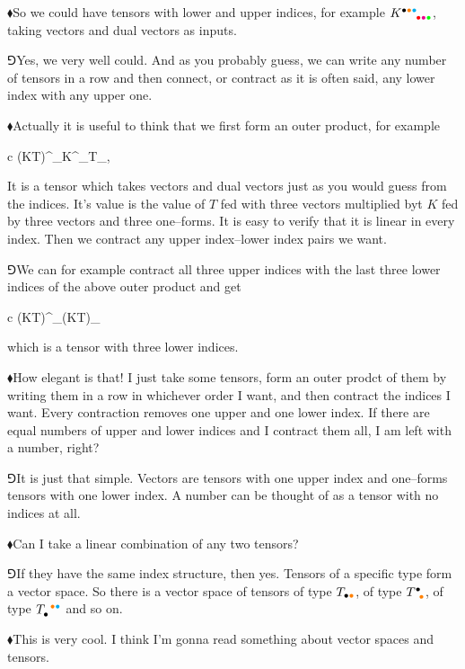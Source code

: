 \documentclass[11pt,oneside%
]{memoir}
\newenvironment{eqna}{\begin{IEEEeqnarray*}{c}}{\end{IEEEeqnarray*}\ignorespacesafterend}
\newcommand{\tensa}[2]{#1_{#2}}
\newcommand{\tensay}[3]{#1_{#2}^{\phantom{#2}#3}}
\newcommand{\tensya}[3]{#1^{#2}_{\phantom{#2}#3}}
\newcommand{\hea}{\(\blacklozenge\)\;}
\newcommand{\heb}{\(\Game\)\;}
\newcommand{\coa}{{\color{black}\bullet}}
\newcommand{\cob}{{\color{oranssi}\bullet}}
\newcommand{\coc}{{\color{cyan}\bullet}}
\newcommand{\cod}{{\color{red}\bullet}}
\newcommand{\coe}{{\color{magenta}\bullet}}
\newcommand{\cof}{{\color{green}\bullet}}
\newcommand{\cog}{{\color{safi}\bullet}}
\newcommand{\coh}{{\color{yellow}\bullet}}
\newcommand{\coi}{{\color{blue}\bullet}}
\begin{document}
\hea So we could have tensors with lower and upper indices, for example \(\tensya{K}{\coa\cob\coc}{\cod\coe\cof}\), taking vectors and dual vectors as inputs.

\heb Yes, we very well could. And as you probably guess, we can write any number of tensors in a row and then connect, or contract as it is often said, any lower index with any upper one.

\hea Actually it is useful to think that we first form an outer product, for example
\begin{eqna}
    \tensya{(K\otimes T)}{\coa\cob\coc}{\cod\coe\cof\cog\coh\coi}\doteq\tensya{K}{\coa\cob\coc}{\cod\coe\cof}\tensa{T}{\cog\coh\coi},
\end{eqna}
It is a tensor which takes vectors and dual vectors just as you would guess from the indices. It's value is the value of \(T\) fed with three vectors multiplied byt \(K\) fed by three vectors and three one--forms. It is easy to verify that it is linear in every index. Then we contract any upper index--lower index pairs we want.

\heb We can for example contract all three upper indices with the last three lower indices of the above outer product and get
\begin{eqna}
    \tensya{(K\otimes T)}{\coa\cob\coc}{\cod\coe\cof\coa\cob\coc}\doteq\tensa{(KT)}{\cod\coe\cof}
\end{eqna}
which is a tensor with three lower indices.

\hea How elegant is that! I just take some tensors, form an outer prodct of them by writing them in a row in whichever order I want, and then contract the indices I want. Every contraction removes one upper and one lower index. If there are equal numbers of upper and lower indices and I contract them all, I am left with a number, right?

\heb It is just that simple. Vectors are tensors with one upper index and one--forms tensors with one lower index. A number can be thought of as a tensor with no indices at all.

\hea Can I take a linear combination of any two tensors?

\heb If they have the same index structure, then yes. Tensors of a specific type form a vector space. So there is a vector space of tensors of type \(T_{\coa\cob}\), of type \(\tensya{T}{\coa}{\cob}\), of type \(\tensay{T}{\coa}{\cob\coc}\) and so on.

\hea This is very cool. I think I'm gonna read something about vector spaces and tensors.
%
\end{document}
